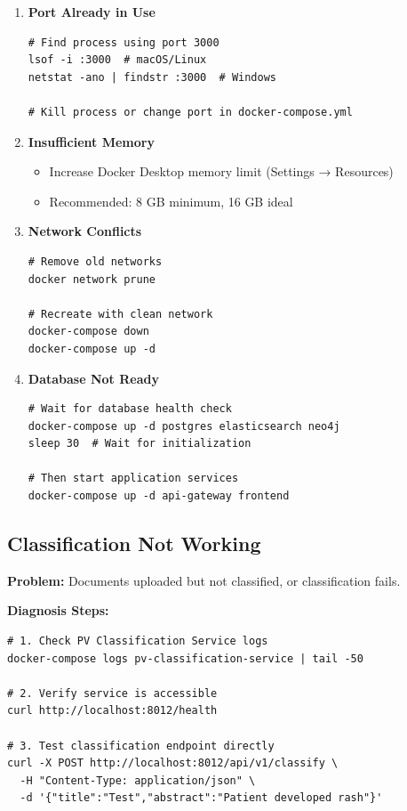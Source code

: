 \begin{enumerate}
    \item \textbf{Port Already in Use}
    \begin{lstlisting}[style=bashstyle]
# Find process using port 3000
lsof -i :3000  # macOS/Linux
netstat -ano | findstr :3000  # Windows

# Kill process or change port in docker-compose.yml
\end{lstlisting}

    \item \textbf{Insufficient Memory}
    \begin{itemize}
        \item Increase Docker Desktop memory limit (Settings → Resources)
        \item Recommended: 8 GB minimum, 16 GB ideal
    \end{itemize}

    \item \textbf{Network Conflicts}
    \begin{lstlisting}[style=bashstyle]
# Remove old networks
docker network prune

# Recreate with clean network
docker-compose down
docker-compose up -d
\end{lstlisting}

    \item \textbf{Database Not Ready}
    \begin{lstlisting}[style=bashstyle]
# Wait for database health check
docker-compose up -d postgres elasticsearch neo4j
sleep 30  # Wait for initialization

# Then start application services
docker-compose up -d api-gateway frontend
\end{lstlisting}
\end{enumerate}

\subsection{Classification Not Working}

\textbf{Problem:} Documents uploaded but not classified, or classification fails.

\textbf{Diagnosis Steps:}
\begin{commandbox}
\begin{lstlisting}[style=bashstyle]
# 1. Check PV Classification Service logs
docker-compose logs pv-classification-service | tail -50

# 2. Verify service is accessible
curl http://localhost:8012/health

# 3. Test classification endpoint directly
curl -X POST http://localhost:8012/api/v1/classify \
  -H "Content-Type: application/json" \
  -d '{"title":"Test","abstract":"Patient developed rash"}'
\end{lstlisting}
\end{commandbox}

